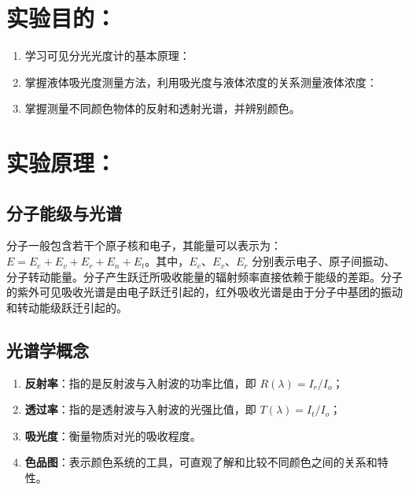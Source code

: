 
\section{实验目的：}
\begin{enumerate}[label=\arabic* 、, leftmargin=4em, labelsep=0pt]
    \item 学习可见分光光度计的基本原理：
    \item 掌握液体吸光度测量方法，利用吸光度与液体浓度的关系测量液体浓度：
    \item 掌握测量不同颜色物体的反射和透射光谱，并辨别颜色。
\end{enumerate}

\section{实验原理：}

\subsection{分子能级与光谱}
分子一般包含若干个原子核和电子，其能量可以表示为：$E = E_e + E_v + E_r + E_n + E_t$。其中，$E_e$、$E_v$、$E_r$ 分别表示电子、原子间振动、分子转动能量。分子产生跃迁所吸收能量的辐射频率直接依赖于能级的差距。分子的紫外可见吸收光谱是由电子跃迁引起的，红外吸收光谱是由于分子中基团的振动和转动能级跃迁引起的。


\subsection{光谱学概念}
\begin{enumerate}[label=\arabic* 、, leftmargin=4em, labelsep=0pt]
    \item \textbf{反射率}：指的是反射波与入射波的功率比值，即 $R(\lambda) = I_r / I_o$；
    \item \textbf{透过率}：指的是透射波与入射波的光强比值，即 $T(\lambda) = I_t / I_o$；
    \item \textbf{吸光度}：衡量物质对光的吸收程度。
    \item \textbf{色品图}：表示颜色系统的工具，可直观了解和比较不同颜色之间的关系和特性。
\end{enumerate}

